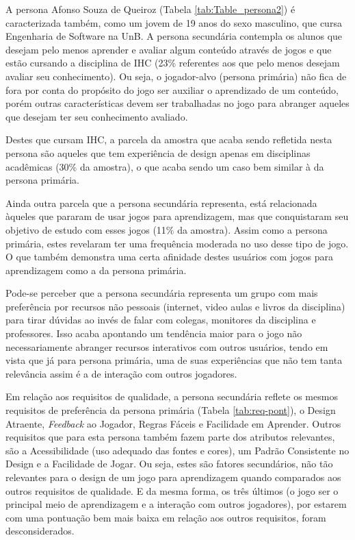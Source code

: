 

A persona Afonso Souza de Queiroz (Tabela \ref{tab:Table_persona2}) é caracterizada também, como um jovem de 19 anos do sexo masculino, que cursa Engenharia de Software na UnB. A persona secundária contempla os alunos que desejam pelo menos aprender e avaliar algum conteúdo através de jogos e que estão cursando a disciplina de IHC (23\% referentes aos que pelo menos desejam avaliar seu conhecimento). Ou seja, o jogador-alvo (persona primária) não fica de fora por conta do propósito do jogo ser auxiliar o aprendizado de um conteúdo, porém outras características devem ser trabalhadas no jogo para abranger aqueles que desejam ter seu conhecimento avaliado. 

Destes que cursam IHC, a parcela da amostra que acaba sendo refletida nesta persona são aqueles que tem experiência de design apenas em disciplinas acadêmicas (30\% da amostra), o que acaba sendo um caso bem similar à da persona primária.

Ainda outra parcela que a persona secundária representa, está relacionada àqueles que pararam  de usar jogos para aprendizagem, mas que conquistaram seu objetivo de estudo com esses jogos (11\% da amostra). Assim como a persona primária, estes revelaram ter uma frequência moderada no uso desse tipo de jogo. O que também demonstra uma certa afinidade destes usuários com jogos para aprendizagem como a da persona primária.

Pode-se perceber que a persona secundária representa um grupo com mais preferência por recursos não pessoais (internet, video aulas e livros da disciplina) para tirar dúvidas ao invés de falar com colegas, monitores da disciplina e professores. Isso acaba apontando um tendência maior para o jogo não necessariamente abranger recursos interativos com outros usuários, tendo em vista que já para persona primária, uma de suas experiências que não tem tanta relevância assim é a de interação com outros jogadores.

Em relação aos requisitos de qualidade, a persona secundária reflete os mesmos requisitos de preferência da persona primária (Tabela \ref{tab:req-pont}), o Design Atraente, \textit{Feedback} ao Jogador, Regras Fáceis e Facilidade em Aprender. Outros requisitos que para esta persona também fazem parte dos atributos relevantes, são a Acessibilidade (uso adequado das fontes e cores), um Padrão Consistente no Design e a Facilidade de Jogar. Ou seja, estes são fatores secundários, não tão relevantes para o design de um jogo para aprendizagem quando comparados aos outros requisitos de qualidade. E da mesma forma, os três últimos (o jogo ser o principal meio de aprendizagem e a interação com outros jogadores), por estarem com uma pontuação bem mais baixa em relação aos outros requisitos, foram desconsiderados.

